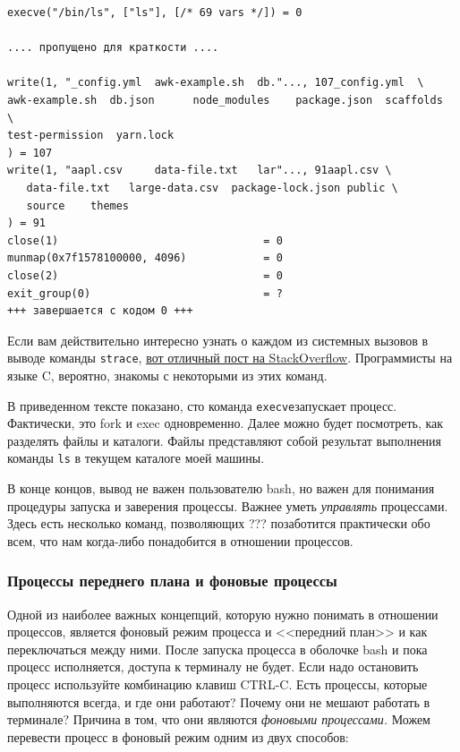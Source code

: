 \documentclass[12pt]{article}
\begin{document}
\begin{verbatim}
execve("/bin/ls", ["ls"], [/* 69 vars */]) = 0

.... пропущено для краткости ....

write(1, "_config.yml  awk-example.sh  db."..., 107_config.yml  \
awk-example.sh  db.json      node_modules    package.json  scaffolds  \
test-permission  yarn.lock
) = 107
write(1, "aapl.csv     data-file.txt   lar"..., 91aapl.csv \
   data-file.txt   large-data.csv  package-lock.json public \
   source    themes
) = 91
close(1)                                = 0
munmap(0x7f1578100000, 4096)            = 0
close(2)                                = 0
exit_group(0)                           = ?
+++ завершается с кодом 0 +++
\end{verbatim}

Если вам действительно интересно узнать о каждом из системных вызовов в
выводе команды \texttt{strace},
\href{https://stackoverflow.com/a/6334557}{вот отличный пост на
StackOverflow}. Программисты на языке C, вероятно, знакомы с некоторыми
из этих команд.

В приведенном тексте показано, сто команда \texttt{execve}запускает
процесс. Фактически, это fork и exec одновременно. Далее можно будет
посмотреть, как разделять файлы и каталоги. Файлы представляют собой
результат выполнения команды \texttt{ls} в текущем каталоге моей машины.

В конце концов, вывод не важен пользователю bash, но важен для понимания
процедуры запуска и заверения процессы. Важнее уметь \emph{управлять}
процессами. Здесь есть несколько команд, позволяющих ??? позаботится
практически обо всем, что нам когда-либо понадобится в отношении
процессов.

\hypertarget{Foreground-vs-Background-Processes}{%
\subsubsection{\texorpdfstring{\protect\hyperlink{Foreground-vs-Background-Processes}{}Процессы
переднего плана и фоновые
процессы}{Процессы переднего плана и фоновые процессы}}\label{Foreground-vs-Background-Processes}}

Одной из наиболее важных концепций, которую нужно понимать в отношении
процессов, является фоновый режим процесса и <<передний план>> и как
переключаться между ними. После запуска процесса в оболочке bash и пока
процесс исполняется, доступа к терминалу не будет. Если надо остановить
процесс используйте комбинацию клавиш CTRL-C. Есть процессы, которые
выполняются всегда, и где они работают? Почему они не мешают работать в
терминале? Причина в том, что они являются \emph{фоновыми процессами.}
Можем перевести процесс в фоновый режим одним из двух способов:
\end{document}

